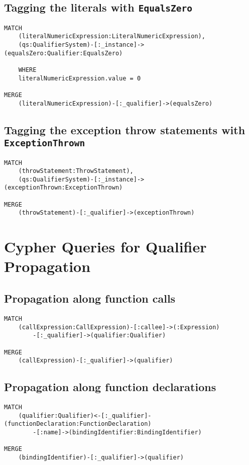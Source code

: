 \subsection[Tagging the literals with EqualsZero]{Tagging the literals with \lstinline{EqualsZero}}
\begin{lstlisting}[language=Cypher]
MATCH
    (literalNumericExpression:LiteralNumericExpression),
    (qs:QualifierSystem)-[:_instance]->(equalsZero:Qualifier:EqualsZero)

    WHERE
    literalNumericExpression.value = 0

MERGE
    (literalNumericExpression)-[:_qualifier]->(equalsZero)
\end{lstlisting}


\subsection[Tagging the exception throw statements with ExceptionThrown]{Tagging the exception throw statements with \lstinline{ExceptionThrown}}
\begin{lstlisting}[language=Cypher]
MATCH
    (throwStatement:ThrowStatement),
    (qs:QualifierSystem)-[:_instance]->(exceptionThrown:ExceptionThrown)

MERGE
    (throwStatement)-[:_qualifier]->(exceptionThrown)
\end{lstlisting}


\newpage
\section{Cypher Queries for Qualifier Propagation}

\subsection{Propagation along function calls}
\begin{lstlisting}[language=Cypher]
MATCH
    (callExpression:CallExpression)-[:callee]->(:Expression)
        -[:_qualifier]->(qualifier:Qualifier)

MERGE
    (callExpression)-[:_qualifier]->(qualifier)
\end{lstlisting}


\subsection{Propagation along function declarations}
\begin{lstlisting}[language=Cypher]
MATCH
    (qualifier:Qualifier)<-[:_qualifier]-(functionDeclaration:FunctionDeclaration)
        -[:name]->(bindingIdentifier:BindingIdentifier)

MERGE
    (bindingIdentifier)-[:_qualifier]->(qualifier)
\end{lstlisting}



